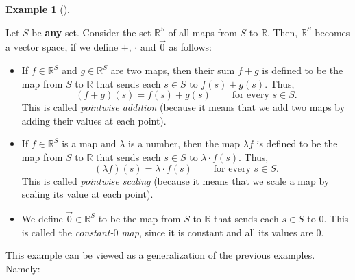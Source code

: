 \documentclass[numbers=enddot,12pt,final,onecolumn,notitlepage]{scrartcl}%
\theoremstyle{definition}
\newtheorem{exam}[theo]{Example}
\newenvironment{example}[1][]
{\begin{exam}[#1]\begin{leftbar}}
{\end{leftbar}\end{exam}}
\begin{document}
\begin{example}
\label{exam.vectspace.RS}Let $S$ be \textbf{any} set. Consider the set
$\mathbb{R}^{S}$ of all maps from $S$ to $\mathbb{R}$. Then, $\mathbb{R}^{S}$
becomes a vector space, if we define $+$, $\cdot$ and $\overrightarrow{0}$ as follows:

\begin{itemize}
\item If $f\in\mathbb{R}^{S}$ and $g\in\mathbb{R}^{S}$ are two maps, then
their sum $f+g$ is defined to be the map from $S$ to $\mathbb{R}$ that sends
each $s\in S$ to $f\left(  s\right)  +g\left(  s\right)  $. Thus,%
\[
\left(  f+g\right)  \left(  s\right)  =f\left(  s\right)  +g\left(  s\right)
\ \ \ \ \ \ \ \ \ \ \text{for every }s\in S.
\]
This is called \textit{pointwise addition} (because it means that we add two
maps by adding their values at each point).

\item If $f\in\mathbb{R}^{S}$ is a map and $\lambda$ is a number, then the map
$\lambda f$ is defined to be the map from $S$ to $\mathbb{R}$ that sends each
$s\in S$ to $\lambda\cdot f\left(  s\right)  $. Thus,%
\[
\left(  \lambda f\right)  \left(  s\right)  =\lambda\cdot f\left(  s\right)
\ \ \ \ \ \ \ \ \ \ \text{for every }s\in S.
\]
This is called \textit{pointwise scaling} (because it means that we scale a
map by scaling its value at each point).

\item We define $\overrightarrow{0}\in\mathbb{R}^{S}$ to be the map from $S$
to $\mathbb{R}$ that sends each $s\in S$ to $0$. This is called the
\textit{constant-}$0$\textit{ map}, since it is constant and all its values
are $0$.
\end{itemize}

This example can be viewed as a generalization of the previous examples. Namely:


\end{example}
\end{document}
